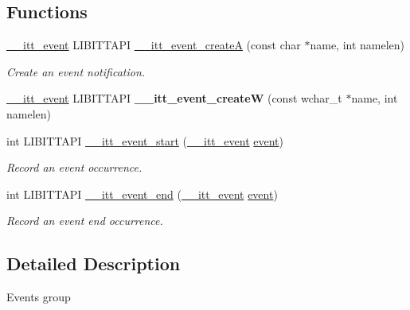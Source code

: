 \subsection*{Functions}
\begin{DoxyCompactItemize}
\item 
\hyperlink{group__legacy__events_gaf3abb988e507916595fa4a13f5a524e4}{\+\_\+\+\_\+itt\+\_\+event} L\+I\+B\+I\+T\+T\+A\+P\+I \hyperlink{group__legacy__events_ga6de94d8c80ce1289fc90a4d4154e4538}{\+\_\+\+\_\+itt\+\_\+event\+\_\+create\+A} (const char $\ast$name, int namelen)
\begin{DoxyCompactList}\small\item\em Create an event notification. \end{DoxyCompactList}\item 
\hypertarget{group__legacy__events_ga656b8b44d98d21f42cdb179f6da343c6}{}\hyperlink{group__legacy__events_gaf3abb988e507916595fa4a13f5a524e4}{\+\_\+\+\_\+itt\+\_\+event} L\+I\+B\+I\+T\+T\+A\+P\+I {\bfseries \+\_\+\+\_\+itt\+\_\+event\+\_\+create\+W} (const wchar\+\_\+t $\ast$name, int namelen)\label{group__legacy__events_ga656b8b44d98d21f42cdb179f6da343c6}

\item 
int L\+I\+B\+I\+T\+T\+A\+P\+I \hyperlink{group__legacy__events_gaa8d6914227075c6a03e18a17e0d0749c}{\+\_\+\+\_\+itt\+\_\+event\+\_\+start} (\hyperlink{group__legacy__events_gaf3abb988e507916595fa4a13f5a524e4}{\+\_\+\+\_\+itt\+\_\+event} \hyperlink{classevent}{event})
\begin{DoxyCompactList}\small\item\em Record an event occurrence. \end{DoxyCompactList}\item 
int L\+I\+B\+I\+T\+T\+A\+P\+I \hyperlink{group__legacy__events_ga652d494fbcc6c727e15cfb60af679816}{\+\_\+\+\_\+itt\+\_\+event\+\_\+end} (\hyperlink{group__legacy__events_gaf3abb988e507916595fa4a13f5a524e4}{\+\_\+\+\_\+itt\+\_\+event} \hyperlink{classevent}{event})
\begin{DoxyCompactList}\small\item\em Record an event end occurrence. \end{DoxyCompactList}\end{DoxyCompactItemize}


\subsection{Detailed Description}
Events group 

